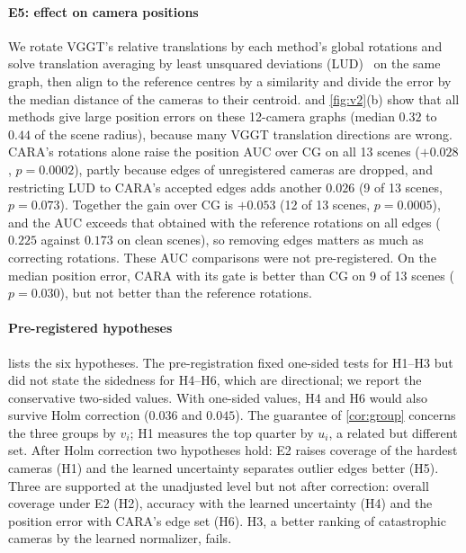 \paragraph*{E5: effect on camera positions} We rotate VGGT's relative translations by each method's global rotations and solve translation averaging by least unsquared deviations (LUD)~\cite{ozyesil2015robust} on the same graph, then align to the reference centres by a similarity and divide the error by the median distance of the cameras to their centroid.  and \cref{fig:v2}(b) show that all methods give large position errors on these 12-camera graphs (median $0.32$ to $0.44$ of the scene radius), because many VGGT translation directions are wrong. CARA's rotations alone raise the position AUC over CG on all 13 scenes ($+0.028$, $p=0.0002$), partly because edges of unregistered cameras are dropped, and restricting LUD to CARA's accepted edges adds another $0.026$ (9 of 13 scenes, $p=0.073$). Together the gain over CG is $+0.053$ (12 of 13 scenes, $p=0.0005$), and the AUC exceeds that obtained with the reference rotations on all edges ($0.225$ against $0.173$ on clean scenes), so removing edges matters as much as correcting rotations. These AUC comparisons were not pre-registered. On the median position error, CARA with its gate is better than CG on 9 of 13 scenes ($p=0.030$), but not better than the reference rotations.



\paragraph*{Pre-registered hypotheses}  lists the six hypotheses. The pre-registration fixed one-sided tests for H1--H3 but did not state the sidedness for H4--H6, which are directional; we report the conservative two-sided values. With one-sided values, H4 and H6 would also survive Holm correction ($0.036$ and $0.045$). The guarantee of \cref{cor:group} concerns the three groups by $v_i$; H1 measures the top quarter by $u_i$, a related but different set. After Holm correction two hypotheses hold: E2 raises coverage of the hardest cameras (H1) and the learned uncertainty separates outlier edges better (H5). Three are supported at the unadjusted level but not after correction: overall coverage under E2 (H2), accuracy with the learned uncertainty (H4) and the position error with CARA's edge set (H6). H3, a better ranking of catastrophic cameras by the learned normalizer, fails.
